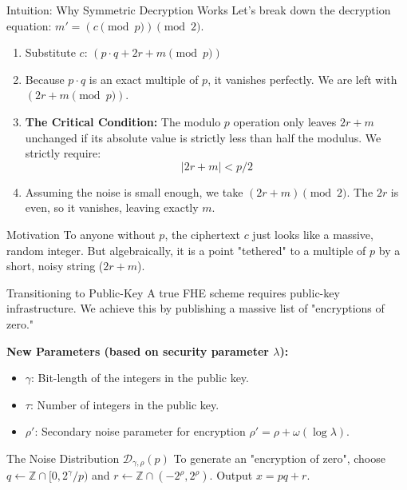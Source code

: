 \documentclass[10pt, aspectratio=169]{beamer}
\begin{document}
\begin{frame}{Intuition: Why Symmetric Decryption Works}
    Let's break down the decryption equation: $m' = (c \pmod p) \pmod 2$.
    \pause
    
    \vspace{0.3cm}
    \begin{enumerate}
        \item Substitute $c$: $(p \cdot q + 2r + m \pmod p)$
        \pause
        \item Because $p \cdot q$ is an exact multiple of $p$, it vanishes perfectly. We are left with $(2r + m \pmod p)$.
        \pause
        \item \textbf{The Critical Condition:} The modulo $p$ operation only leaves $2r+m$ unchanged if its absolute value is strictly less than half the modulus. We strictly require:
        $$|2r + m| < p/2$$
        \pause
        \item Assuming the noise is small enough, we take $(2r + m) \pmod 2$. The $2r$ is even, so it vanishes, leaving exactly $m$.
    \end{enumerate}
    \pause
    
    \begin{block}{Motivation}
    To anyone without $p$, the ciphertext $c$ just looks like a massive, random integer. But algebraically, it is a point "tethered" to a multiple of $p$ by a short, noisy string ($2r+m$).
    \end{block}
\end{frame}

\begin{frame}{Transitioning to Public-Key}
    A true FHE scheme requires public-key infrastructure. We achieve this by publishing a massive list of "encryptions of zero."
    \pause

    \vspace{0.2cm}
    \textbf{New Parameters (based on security parameter $\lambda$):}
    \begin{itemize}
        \item $\gamma$: Bit-length of the integers in the public key.
        \item $\tau$: Number of integers in the public key.
        \item $\rho'$: Secondary noise parameter for encryption $\rho' = \rho + \omega(\log \lambda)$.
    \end{itemize}
    \pause

    \vspace{0.2cm}
    \begin{block}{The Noise Distribution $\mathcal{D}_{\gamma,\rho}(p)$}
    To generate an "encryption of zero", choose $q \leftarrow \mathbb{Z} \cap [0, 2^\gamma/p)$ and $r \leftarrow \mathbb{Z} \cap (-2^\rho, 2^\rho)$. 
    Output $x = pq + r$.
    \end{block}
\end{frame}
\end{document}
